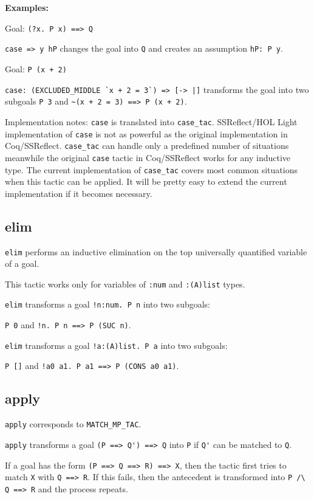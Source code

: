 \documentclass[a4paper]{article}
\begin{document}
{\bf Examples:}

Goal: \verb|(?x. P x) ==> Q|

\verb|case => y hP| changes the goal into \verb|Q| and creates an assumption \verb|hP: P y|.

Goal: \verb|P (x + 2)|

\verb$case: (EXCLUDED_MIDDLE `x + 2 = 3`) => [-> |]$ transforms the goal into two subgoals
\verb|P 3| and \verb|~(x + 2 = 3) ==> P (x + 2)|.

Implementation notes: \verb|case| is translated into \verb|case_tac|. SSReflect/HOL Light implementation of \verb|case| is not as powerful as the original implementation in Coq/SSReflect. \verb|case_tac| can handle only a predefined number of situations meanwhile the original \verb|case| tactic in Coq/SSReflect works for any inductive type. The current implementation of \verb|case_tac| covers most common situations when this tactic can be applied. It will be pretty easy to extend the current implementation if it becomes necessary.


\subsection{elim}
\verb|elim| performs an inductive elimination on the top universally quantified variable of a goal.

This tactic works only for variables of \verb|:num| and \verb|:(A)list| types.

\verb|elim| transforms a goal \verb|!n:num. P n| into two subgoals: 

\verb|P 0| and \verb|!n. P n ==> P (SUC n)|.

\verb|elim| transforms a goal \verb|!a:(A)list. P a| into two subgoals: 

\verb|P []| and \verb|!a0 a1. P a1 ==> P (CONS a0 a1)|.


\subsection{apply}
\verb|apply| corresponds to \verb|MATCH_MP_TAC|.

\verb|apply| transforms a goal \verb|(P ==> Q') ==> Q| into \verb|P| if \verb|Q'| can be matched to \verb|Q|.

If a goal has the form \verb|(P ==> Q ==> R) ==> X|, then the tactic first tries to match \verb|X| with \verb|Q ==> R|. If this fails, then the antecedent is transformed into \verb|P /\ Q ==> R| and the process repeats.
\end{document}
